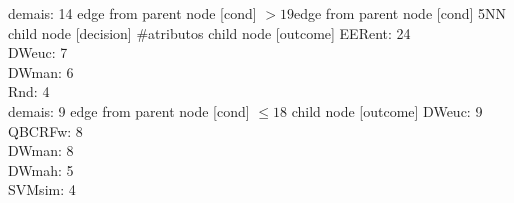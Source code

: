 {{{{demais: 14} edge from parent node [cond] {$>19$}}edge from parent node [cond] {5NN}}
%
child {node [decision] {\#atributos}
child {node [outcome] {
EERent: 24\\
DWeuc: 7\\
DWman: 6\\
Rnd: 4\\
demais: 9} edge from parent node [cond] {$\leq18$}}
child {node [outcome] {
DWeuc: 9\\
QBCRFw: 8\\
DWman: 8\\
DWmah: 5\\
SVMsim: 4\\
}}}}
